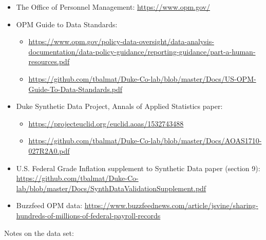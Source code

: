 \documentclass[10pt, letterpaper]{article}
\begin{document}
\begin{spacing}{1.0}
\begin{itemize}
  \item The Office of Personnel Management:  \url{https://www.opm.gov/}
  \item OPM Guide to Data Standards:
    \begin{itemize}
      \item \url{https://www.opm.gov/policy-data-oversight/data-analysis-documentation/data-policy-guidance/reporting-guidance/part-a-human-resources.pdf}
      \item \url{https://github.com/tbalmat/Duke-Co-lab/blob/master/Docs/US-OPM-Guide-To-Data-Standards.pdf}
    \end{itemize}
  \item Duke Synthetic Data Project, Annals of Applied Statistics paper:
    \begin{itemize}
      \item \url{https://projecteuclid.org/euclid.aoas/1532743488}
      \item \url{https://github.com/tbalmat/Duke-Co-lab/blob/master/Docs/AOAS1710-027R2A0.pdf}
    \end{itemize}
  \item U.S. Federal Grade Inflation supplement to Synthetic Data paper (section 9):  \url{https://github.com/tbalmat/Duke-Co-lab/blob/master/Docs/SynthDataValidationSupplement.pdf}
  \item Buzzfeed OPM data:  \url{https://www.buzzfeednews.com/article/jsvine/sharing-hundreds-of-millions-of-federal-payroll-records}
\end{itemize}

Notes on the data set:


\end{spacing}
\end{document}
